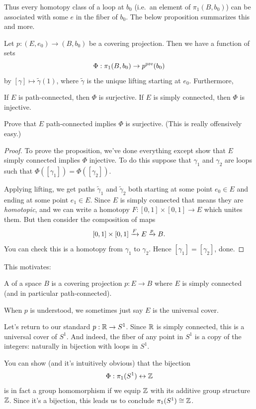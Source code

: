 Thus every homotopy class of a loop at $b_0$ (i.e.\ an element of $\pi_1(B, b_0)$) can be associated with some $e$ in the fiber of $b_0$.
The below proposition summarizes this and more.
\begin{proposition}
	Let $p : (E,e_0) \to (B,b_0)$ be a covering projection.
	Then we have a function of sets
	\[ \Phi : \pi_1(B, b_0) \to p^{\text{pre}}(b_0) \]
	by $[\gamma] \mapsto \tilde\gamma(1)$, where $\tilde\gamma$
	is the unique lifting starting at $e_0$.
	Furthermore,
	\begin{itemize}
		\ii If $E$ is path-connected, then $\Phi$ is surjective.
		\ii If $E$ is simply connected, then $\Phi$ is injective.
	\end{itemize}
\end{proposition}
\begin{ques}
	Prove that $E$ path-connected implies $\Phi$ is surjective.
	(This is really offensively easy.)
\end{ques}
\begin{proof}
	To prove the proposition, we've done everything except show
	that $E$ simply connected implies $\Phi$ injective.
	To do this suppose that $\gamma_1$ and $\gamma_2$ are loops
	such that $\Phi([\gamma_1]) = \Phi([\gamma_2])$.

	Applying lifting, we get paths $\tilde\gamma_1$ and $\tilde\gamma_2$
	both starting at some point $e_0 \in E$ and ending at some point $e_1 \in E$.
	Since $E$ is simply connected that means they are \emph{homotopic},
	and we can write a homotopy $F : [0,1] \times [0,1] \to E$
	which unites them.
	But then consider the composition of maps
	\[ [0,1] \times [0,1] \xrightarrow{F} E \xrightarrow{p} B. \]
	You can check this is a homotopy from $\gamma_1$ to $\gamma_2$.
	Hence $[\gamma_1] = [\gamma_2]$, done.
\end{proof}

This motivates:
\begin{definition}
	A  of a space $B$ is a covering projection
	$p : E \to B$ where $E$ is simply connected (and in particular path-connected).
\end{definition}
\begin{abuse}
	When $p$ is understood, we sometimes just say $E$ is the universal cover.
\end{abuse}

\begin{example}
	Let's return to our standard $p : \mathbb R \to S^1$.
	Since $\mathbb R$ is simply connected, this is a universal cover of $S^1$.
	And indeed, the fiber of any point in $S^1$
	is a copy of the integers: naturally in bijection with loops in $S^1$.
	
	You can show (and it's intuitively obvious) that the bijection
	\[ \Phi : \pi_1(S^1) \leftrightarrow \mathbb Z \]
	is in fact a group homomorphism if we equip $\mathbb Z$ with its
	additive group structure $\mathbb Z$.
	Since it's a bijection, this leads us to conclude $\pi_1(S^1) \cong \mathbb Z$.
\end{example}

